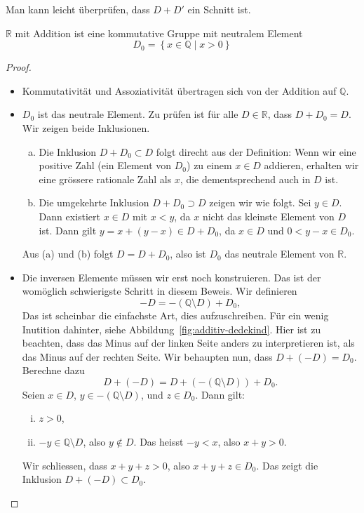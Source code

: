 \documentclass[../main.tex]{subfiles}
\begin{document}
Man kann leicht überprüfen, dass $D + D'$ ein Schnitt ist.

\begin{manuallemma}{1}
  $\mathbb R$ mit Addition ist eine kommutative Gruppe mit neutralem Element
  \[D_{0} = \left\{x \in \mathbb Q \mid x > 0\right\}\]
\end{manuallemma}

\begin{proof}
  \leavevmode
  \begin{itemize}
    \item Kommutativität und Assoziativität übertragen sich von der Addition
      auf $\mathbb Q$.
    \item $D_{0}$ ist das neutrale Element. Zu prüfen ist
      für alle $D \in \mathbb R$, dass $D + D_{0} = D$. Wir
      zeigen beide Inklusionen.
      \begin{enumerate}[(a)]
        \item Die Inklusion $D + D_{0} \subset D$ folgt direcht aus
          der Definition: Wenn wir eine positive Zahl
          (ein Element von $D_{0}$) zu einem
          $x \in D$ addieren, erhalten wir eine grössere
          rationale Zahl als $x$, die dementsprechend auch in $D$ ist.
        \item Die umgekehrte Inklusion $D + D_{0} \supset D$ zeigen
          wir wie folgt. Sei $y \in D$. Dann existiert $x \in D$ mit
          $x < y$, da $x$ nicht das kleinste Element von $D$ ist.
          Dann gilt $y = x + (y - x) \in D + D_{0}$, da $x \in D$
          und $0 < y - x \in D_{0}$.
      \end{enumerate}
      Aus (a) und (b) folgt $D = D + D_{0}$, also ist $D_{0}$ das
      neutrale Element von $\mathbb R$.
    \item Die inversen Elemente müssen wir erst noch konstruieren.
      Das ist der womöglich schwierigste Schritt in diesem Beweis.
      Wir definieren
      \[-D = -(\mathbb Q \setminus D) + D_{0},\]
      Das ist scheinbar die einfachste Art, dies aufzuschreiben.
      Für ein wenig Inutition dahinter, siehe
      Abbildung~\ref{fig:additiv-dedekind}.
      Hier ist zu beachten, dass das Minus auf der linken Seite
      anders zu interpretieren ist, als das Minus auf der rechten
      Seite.
      Wir behaupten nun, dass $D + (-D) = D_{0}$. Berechne dazu
        \[D + (-D) = D  + (-(\mathbb Q \setminus D)) + D_{0}.\]
      Seien $x \in D$, $y \in -(\mathbb Q \setminus D)$, und $z \in D_{0}$.
      Dann gilt:
      \begin{enumerate}[(i)]
        \item $z > 0$,
        \item $-y \in \mathbb Q \setminus D$, also $y \notin D$.
          Das heisst $-y < x$, also $x + y > 0$.
      \end{enumerate}
      Wir schliessen, dass $x + y + z > 0$, also $x + y + z \in D_{0}$.
      Das zeigt die Inklusion $D + (-D) \subset D_{0}$. 
      

\end{itemize}
\end{proof}
\end{document}
